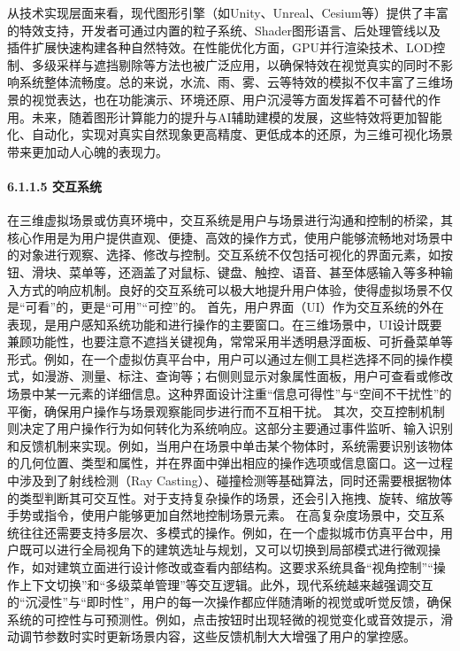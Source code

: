 {{从技术实现层面来看，现代图形引擎（如Unity、Unreal、Cesium等）提供了丰富的特效支持，开发者可通过内置的粒子系统、Shader图形语言、后处理管线以及插件扩展快速构建各种自然特效。在性能优化方面，GPU并行渲染技术、LOD控制、多级采样与遮挡剔除等方法也被广泛应用，以确保特效在视觉真实的同时不影响系统整体流畅度。总的来说，水流、雨、雾、云等特效的模拟不仅丰富了三维场景的视觉表达，也在功能演示、环境还原、用户沉浸等方面发挥着不可替代的作用。未来，随着图形计算能力的提升与AI辅助建模的发展，这些特效将更加智能化、自动化，实现对真实自然现象更高精度、更低成本的还原，为三维可视化场景带来更加动人心魄的表现力。
\paragraph{6.1.1.5 交互系统}\label{ux4ea4ux4e92ux7cfbux7edf}
在三维虚拟场景或仿真环境中，交互系统是用户与场景进行沟通和控制的桥梁，其核心作用是为用户提供直观、便捷、高效的操作方式，使用户能够流畅地对场景中的对象进行观察、选择、修改与控制。交互系统不仅包括可视化的界面元素，如按钮、滑块、菜单等，还涵盖了对鼠标、键盘、触控、语音、甚至体感输入等多种输入方式的响应机制。良好的交互系统可以极大地提升用户体验，使得虚拟场景不仅是``可看''的，更是``可用''``可控''的。
首先，用户界面（UI）作为交互系统的外在表现，是用户感知系统功能和进行操作的主要窗口。在三维场景中，UI设计既要兼顾功能性，也要注意不遮挡关键视角，常常采用半透明悬浮面板、可折叠菜单等形式。例如，在一个虚拟仿真平台中，用户可以通过左侧工具栏选择不同的操作模式，如漫游、测量、标注、查询等；右侧则显示对象属性面板，用户可查看或修改场景中某一元素的详细信息。这种界面设计注重``信息可得性''与``空间不干扰性''的平衡，确保用户操作与场景观察能同步进行而不互相干扰。
其次，交互控制机制则决定了用户操作行为如何转化为系统响应。这部分主要通过事件监听、输入识别和反馈机制来实现。例如，当用户在场景中单击某个物体时，系统需要识别该物体的几何位置、类型和属性，并在界面中弹出相应的操作选项或信息窗口。这一过程中涉及到了射线检测（Ray
Casting）、碰撞检测等基础算法，同时还需要根据物体的类型判断其可交互性。对于支持复杂操作的场景，还会引入拖拽、旋转、缩放等手势或指令，使用户能够更加自然地控制场景元素。
在高复杂度场景中，交互系统往往还需要支持多层次、多模式的操作。例如，在一个虚拟城市仿真平台中，用户既可以进行全局视角下的建筑选址与规划，又可以切换到局部模式进行微观操作，如对建筑立面进行设计修改或查看内部结构。这要求系统具备``视角控制''``操作上下文切换''和``多级菜单管理''等交互逻辑。此外，现代系统越来越强调交互的``沉浸性''与``即时性''，用户的每一次操作都应伴随清晰的视觉或听觉反馈，确保系统的可控性与可预测性。例如，点击按钮时出现轻微的视觉变化或音效提示，滑动调节参数时实时更新场景内容，这些反馈机制大大增强了用户的掌控感。
}}
